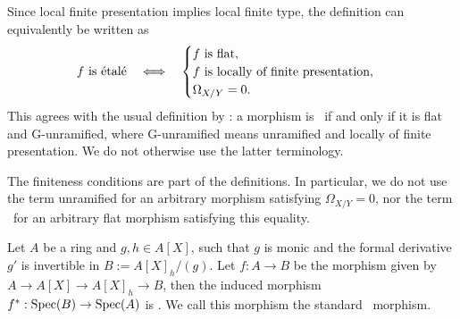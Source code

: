 \begin{remark}\label{rem:etale-definitions-agree}
	Since local finite presentation implies local finite
	type, the definition can equivalently be written as
	\[
	f\text{ is \'etal\'e}
	\quad\Longleftrightarrow\quad
	\begin{cases}
		f\text{ is flat},\\
		f\text{ is locally of finite presentation},\\
		\Omega_{X/Y}=0.
	\end{cases}
	\]
	This agrees with the usual definition by
	\cite[][Tag 02GV]{stacks-project}: a morphism is
	\etale\ if and only if it is flat and G-unramified,
	where G-unramified means unramified and locally of
	finite presentation. We do not otherwise use the
	latter terminology.
\end{remark}

\begin{remark}
	The finiteness conditions are part of the definitions.
	In particular, we do not use the term unramified for
	an arbitrary morphism satisfying
	$\Omega_{X/Y}=0$, nor the term \etale\ for an
	arbitrary flat morphism satisfying this equality.
\end{remark}

\begin{example}
	\label{ex:standard-etale}
	Let $A$ be a ring and $g,h \in A[X]$, such that $g$ is monic and the formal derivative $g'$ is invertible in $B:=A[X]_h/(g)$. Let $f:A \to B$ be the morphism given by $A \to A[X] \to A[X]_h \to B$, then the induced morphism $f^*:\operatorname{Spec}\!\left(B\right) \to \operatorname{Spec}\!\left(A\right)$ is \etale. We call this morphism the standard \etale\ morphism.
\end{example}

